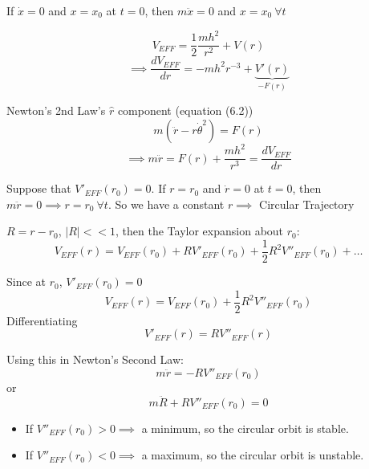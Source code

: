 If $\dot{x} = 0$ and $x = x_0$ at $t = 0$, then $m\ddot{x} = 0$ and $x = x_0~\forall t$

\[V_{EFF} =\dfrac{1}{2}\dfrac{mh^2}{r^2} + V(r)\]
\[\implies \frac{dV_{EFF}}{dr} = -mh^2r^{-3} + \underbrace{V'(r)}_{-F(r)}\]

Newton's 2nd Law's $\hat{r}$ component (equation (6.2))
\[m(\ddot{r} - r\dot{\theta}^2) = F(r)\]
\[\implies m\ddot{r} = F(r) + \frac{mh^2}{r^3} = \frac{dV_{EFF}}{dr}\]

Suppose that $V'_{EFF}(r_0) = 0$. If $r = r_0$ and $\dot{r} = 0$ at $t = 0$, then $m\ddot{r} = 0 \implies r = r_0~\forall t$. So we have a constant $r\implies $ Circular Trajectory

$R = r-r_0$, $|R| << 1$, then the Taylor expansion about $r_0$:
\begin{equation}V_{EFF}(r) = V_{EFF}(r_0) + RV'_{EFF}(r_0) + \frac{1}{2}R^2V''_{EFF}(r_0) + \dots	
\end{equation}


Since at $r_0$, $V'_{EFF}(r_0) = 0$
\[V_{EFF}(r) = V_{EFF}(r_0) + \frac{1}{2}R^2V''_{EFF}(r_0)\]
Differentiating
\[V'_{EFF}(r) = RV''_{EFF}(r)\]

Using this in Newton's Second Law: 
\[m\ddot{r} = -RV''_{EFF}(r_0)\]
or 
\[m\ddot{R} + RV''_{EFF}(r_0)= 0\]

\begin{itemize}
\item If $V''_{EFF}(r_0)>0 \implies$ a minimum, so the circular orbit is stable.

\item If $V''_{EFF}(r_0) < 0 \implies$ a maximum, so the circular orbit is unstable. 
\end{itemize}~


